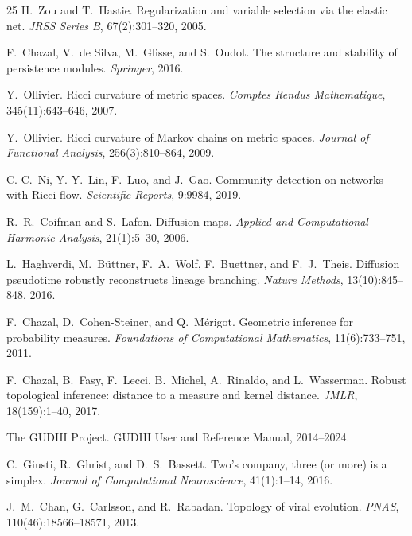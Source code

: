 \documentclass[12pt]{article}
\begin{document}
\begin{thebibliography}{25}
H.~Zou and T.~Hastie.
Regularization and variable selection via the elastic net.
\emph{JRSS Series B}, 67(2):301--320, 2005.

F.~Chazal, V.~de Silva, M.~Glisse, and S.~Oudot.
The structure and stability of persistence modules.
\emph{Springer}, 2016.

Y.~Ollivier.
Ricci curvature of metric spaces.
\emph{Comptes Rendus Mathematique}, 345(11):643--646, 2007.

Y.~Ollivier.
Ricci curvature of Markov chains on metric spaces.
\emph{Journal of Functional Analysis}, 256(3):810--864, 2009.

C.-C.~Ni, Y.-Y.~Lin, F.~Luo, and J.~Gao.
Community detection on networks with Ricci flow.
\emph{Scientific Reports}, 9:9984, 2019.

R.~R.~Coifman and S.~Lafon.
Diffusion maps.
\emph{Applied and Computational Harmonic Analysis}, 21(1):5--30, 2006.

L.~Haghverdi, M.~B\"uttner, F.~A.~Wolf, F.~Buettner, and F.~J.~Theis.
Diffusion pseudotime robustly reconstructs lineage branching.
\emph{Nature Methods}, 13(10):845--848, 2016.

F.~Chazal, D.~Cohen-Steiner, and Q.~M\'erigot.
Geometric inference for probability measures.
\emph{Foundations of Computational Mathematics}, 11(6):733--751, 2011.

F.~Chazal, B.~Fasy, F.~Lecci, B.~Michel, A.~Rinaldo, and L.~Wasserman.
Robust topological inference: distance to a measure and kernel distance.
\emph{JMLR}, 18(159):1--40, 2017.

The GUDHI Project.
GUDHI User and Reference Manual, 2014--2024.

C.~Giusti, R.~Ghrist, and D.~S.~Bassett.
Two's company, three (or more) is a simplex.
\emph{Journal of Computational Neuroscience}, 41(1):1--14, 2016.

J.~M.~Chan, G.~Carlsson, and R.~Rabadan.
Topology of viral evolution.
\emph{PNAS}, 110(46):18566--18571, 2013.


\end{thebibliography}
\end{document}

